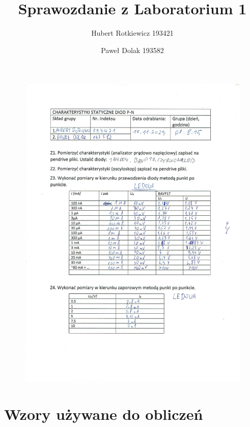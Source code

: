 \documentclass{article}
\title{Sprawozdanie z Laboratorium 1}
\author{
  Hubert Rotkiewicz 193421 \and 
  Paweł Dolak 193582
}
\begin{document}
\maketitle
\begin{figure}[h]
  \includegraphics[scale=0.6]{./img/Protokol_pp_cw1.jpg}
\end{figure}
\clearpage
\raggedright
\section{Wzory używane do obliczeń}
\end{document}
